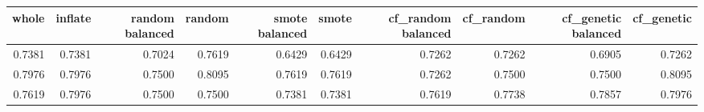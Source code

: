 \begin{tabular}{rrrrrrrrrr}
\toprule

 whole &  inflate &  random balanced &  random &  smote balanced &  smote &  cf\_random balanced &  cf\_random &  cf\_genetic balanced &  cf\_genetic \\
\midrule

0.7381 &   0.7381 &           0.7024 &  0.7619 &          0.6429 & 0.6429 &              0.7262 &     0.7262 &               0.6905 &      0.7262 \\
0.7976 &   0.7976 &           0.7500 &  0.8095 &          0.7619 & 0.7619 &              0.7262 &     0.7500 &               0.7500 &      0.8095 \\
0.7619 &   0.7976 &           0.7500 &  0.7500 &          0.7381 & 0.7381 &              0.7619 &     0.7738 &               0.7857 &      0.7976 \\

\bottomrule
\end{tabular}
